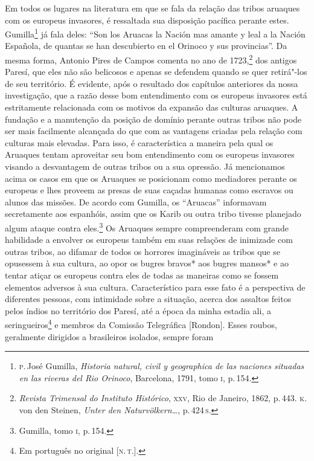 Em todos os lugares na literatura em que se fala da relação das tribos
aruaques com os europeus invasores, é ressaltada sua disposição pacífica
perante estes. Gumilla\footnote{\textsc{p}.\,José Gumilla, \textit{Historia
  natural, civil y geographica de las naciones situadas en las riveras
  del Rio Orinoco}, Barcelona, 1791, tomo \textsc{i}, p.\,154.} já fala deles:
``Son los Aruacas la Nación mas amante y leal a la Nación Española, de
quantas se han descubierto en el Orinoco y sus provincias''. Da mesma
forma, Antonio Pires de Campos comenta no ano de 1723,\footnote{\textit{Revista
  Trimensal do Instituto Histórico}, \textsc{xxv}, Rio de Janeiro, 1862, p.\,443.
  \textsc{k}.\,von den Steinen, \textit{Unter den Naturvölkern\ldots}, p.\,424\,\textsc{s}.} dos
antigos Paresí, que eles não são belicosos e apenas se defendem quando
se quer retirá"-los de seu território. É evidente, após o resultado dos
capítulos anteriores da nossa investigação, que a razão desse bom
entendimento com os europeus invasores está estritamente relacionada
com os motivos da expansão das culturas aruaques. A fundação e a
manutenção da posição de domínio perante outras tribos não pode ser mais
facilmente alcançada do que com as vantagens criadas pela relação com
culturas mais elevadas. Para isso, é característica a maneira pela qual
os Aruaques tentam aproveitar seu bom entendimento com os europeus
invasores visando a desvantagem de outras tribos ou a sua opressão. Já
mencionamos acima os casos em que os Aruaques se posicionam como
mediadores perante os europeus e lhes proveem as presas de suas caçadas
humanas como escravos ou alunos das missões. De acordo com Gumilla, os
``Aruacas'' informavam secretamente aos espanhóis, assim que os Karib
ou outra tribo tivesse planejado algum ataque contra eles.\footnote{Gumilla, tomo \textsc{i}, p.\,154.} Os Aruaques sempre
compreenderam com grande habilidade a envolver os europeus também em
suas relações de inimizade com outras tribos, ao difamar de todos os
horrores imagináveis as tribos que se opusessem à sua cultura, ao opor
os bugres bravos* aos bugres mansos* e ao tentar atiçar os europeus
contra eles de todas as maneiras como se fossem elementos adversos à sua
cultura. Característico para esse fato é a perspectiva de diferentes
pessoas, com intimidade sobre a situação, acerca dos assaltos feitos
pelos índios no território dos Paresí, até a época da minha estadia
ali, a seringueiros\footnote{Em português no original {[}\textsc{n.\,t.}{]}.} e membros da Comissão Telegráfica {[}Rondon{]}.
Esses roubos, geralmente dirigidos a brasileiros isolados, sempre foram

